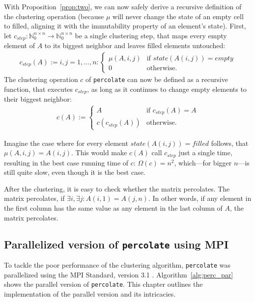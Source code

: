 \documentclass[twoside,11pt]{article}
\def\perc{\texttt{perco\-late}}
\begin{document}
With Proposition~\ref{prop:two}, we can now safely derive
a recursive definition of the clustering operation (because
$\mu$ will never change the state of an empty cell to
filled, aligning it with the immutability property of an
element's state).
First, let $c_{step}:\mathbb{N}_0^{n \times n} \rightarrow
\mathbb{N}_0^{n \times n}$ be a single clustering step,
that maps every empty element of $A$ to its biggest
neighbor and leaves filled elements untouched:
\begin{align*}
  c_{step}(A) := i,j=1,\dots,n: \begin{cases}
    \mu(A, i, j) &\text{if } state(A(i, j)) = empty \\
    0 &\text{otherwise}.
  \end{cases}
\end{align*}
The clustering operation $c$ of \perc{} can now be defined
as a recursive function, that executes $c_{step}$, as long
as it continues to change empty elements to their biggest
neighbor:
\begin{align*}
  c(A) := \begin{cases}
    A &\text{if } c_{step}(A) = A \\
    c(c_{step}(A)) &\text{otherwise}.
  \end{cases}
\end{align*}

Imagine the case where for every element
$state(A(i,j)) = filled$ follows, that
$\mu(A, i, j) = A(i, j)$.
This would make $c(A)$ call $c_{step}$ just a single time,
resulting in the best case running time of $c$:
$\Omega(c) = n^2$, which---for bigger $n$---is still quite
slow, even though it is the best case.

After the clustering, it is easy to check whether the
matrix percolates.
The matrix percolates, if $\exists i, \exists j: A(i,1) =
A(j,n)$.
In other words, if any element in the first column has the
same value as any element in the last column of $A$, the
matrix percolates.



\subsection{Parallelized version of \perc{} using MPI}

To tackle the poor performance of the clustering algorithm,
\perc{} was parallelized using the MPI Standard,
version 3.1 \citep[see][]{mpi}.
Algorithm~\ref{alg:perc_par} shows the parallel version of
\perc{}.
This chapter outlines the implementation of the parallel
version and its intricacies.
\end{document}
